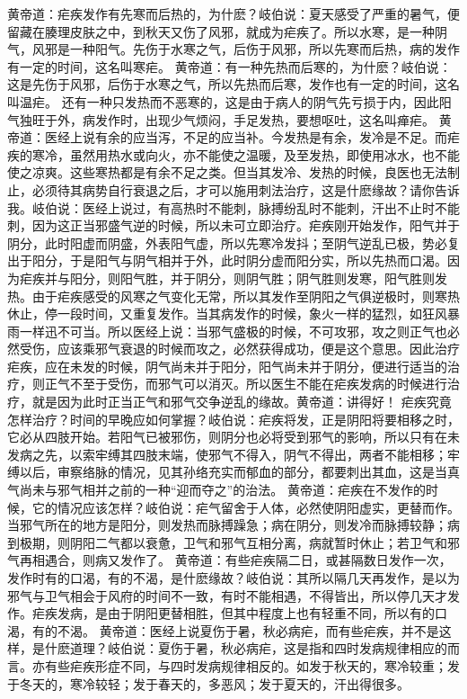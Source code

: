 \documentclass[a4paper,12pt,UTF8,twoside]{ctexbook}
\begin{document}
黄帝道：疟疾发作有先寒而后热的，为什麽？岐伯说：夏天感受了严重的暑气，便留藏在腠理皮肤之中，到秋天又伤了风邪，就成为疟疾了。所以水寒，是一种阴气，风邪是一种阳气。先伤于水寒之气，后伤于风邪，所以先寒而后热，病的发作有一定的时间，这名叫寒疟。
黄帝道：有一种先热而后寒的，为什麽？岐伯说：这是先伤于风邪，后伤于水寒之气，所以先热而后寒，发作也有一定的时间，这名叫温疟。
还有一种只发热而不恶寒的，这是由于病人的阴气先亏损于内，因此阳气独旺于外，病发作时，出现少气烦闷，手足发热，要想呕吐，这名叫瘅疟。
黄帝道：医经上说有余的应当泻，不足的应当补。今发热是有余，发冷是不足。而疟疾的寒冷，虽然用热水或向火，亦不能使之温暖，及至发热，即使用冰水，也不能使之凉爽。这些寒热都是有余不足之类。但当其发冷、发热的时候，良医也无法制止，必须待其病势自行衰退之后，才可以施用刺法治疗，这是什麽缘故？请你告诉我。岐伯说：医经上说过，有高热时不能刺，脉搏纷乱时不能刺，汗出不止时不能刺，因为这正当邪盛气逆的时候，所以未可立即治疗。疟疾刚开始发作，阳气并于阴分，此时阳虚而阴盛，外表阳气虚，所以先寒冷发抖；至阴气逆乱已极，势必复出于阳分，于是阳气与阴气相并于外，此时阴分虚而阳分实，所以先热而口渴。因为疟疾并与阳分，则阳气胜，并于阴分，则阴气胜；阴气胜则发寒，阳气胜则发热。由于疟疾感受的风寒之气变化无常，所以其发作至阴阳之气俱逆极时，则寒热休止，停一段时间，又重复发作。当其病发作的时候，象火一样的猛烈，如狂风暴雨一样迅不可当。所以医经上说：当邪气盛极的时候，不可攻邪，攻之则正气也必然受伤，应该乘邪气衰退的时候而攻之，必然获得成功，便是这个意思。因此治疗疟疾，应在未发的时候，阴气尚未并于阳分，阳气尚未并于阴分，便进行适当的治疗，则正气不至于受伤，而邪气可以消灭。所以医生不能在疟疾发病的时候进行治疗，就是因为此时正当正气和邪气交争逆乱的缘故。黄帝道：讲得好！
疟疾究竟怎样治疗？时间的早晚应如何掌握？岐伯说：疟疾将发，正是阴阳将要相移之时，它必从四肢开始。若阳气已被邪伤，则阴分也必将受到邪气的影响，所以只有在未发病之先，以索牢缚其四肢末端，使邪气不得入，阴气不得出，两者不能相移；牢缚以后，审察络脉的情况，见其孙络充实而郁血的部分，都要刺出其血，这是当真气尚未与邪气相并之前的一种“迎而夺之”的治法。
黄帝道：疟疾在不发作的时候，它的情况应该怎样？岐伯说：疟气留舍于人体，必然使阴阳虚实，更替而作。当邪气所在的地方是阳分，则发热而脉搏躁急；病在阴分，则发冷而脉搏较静；病到极期，则阴阳二气都以衰惫，卫气和邪气互相分离，病就暂时休止；若卫气和邪气再相遇合，则病又发作了。
黄帝道：有些疟疾隔二日，或甚隔数日发作一次，发作时有的口渴，有的不渴，是什麽缘故？岐伯说：其所以隔几天再发作，是以为邪气与卫气相会于风府的时间不一致，有时不能相遇，不得皆出，所以停几天才发作。疟疾发病，是由于阴阳更替相胜，但其中程度上也有轻重不同，所以有的口渴，有的不渴。
黄帝道：医经上说夏伤于暑，秋必病疟，而有些疟疾，并不是这样，是什麽道理？岐伯说：夏伤于暑，秋必病疟，这是指和四时发病规律相应的而言。亦有些疟疾形症不同，与四时发病规律相反的。如发于秋天的，寒冷较重；发于冬天的，寒冷较轻；发于春天的，多恶风；发于夏天的，汗出得很多。
\end{document}
